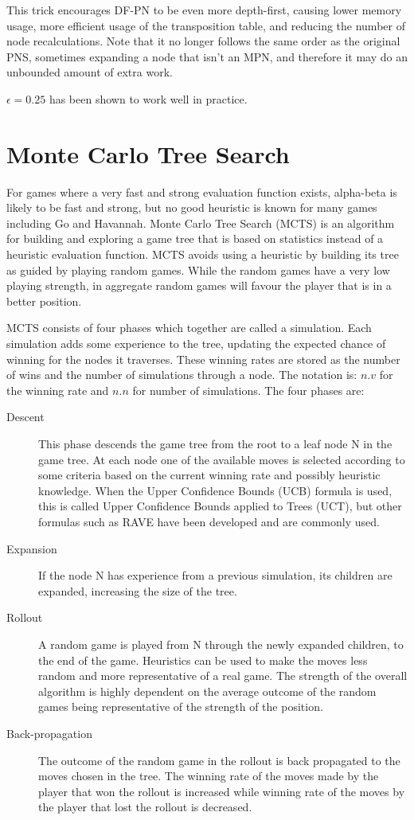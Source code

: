 This trick encourages DF-PN to be even more depth-first, causing lower memory usage, more efficient usage of the transposition table, and reducing the number of node recalculations. Note that it no longer follows the same order as the original PNS, sometimes expanding a node that isn't an MPN, and therefore it may do an unbounded amount of extra work.

$\epsilon = 0.25$ has been shown to work well in practice.


\section{Monte Carlo Tree Search}

For games where a very fast and strong evaluation function exists, alpha-beta is likely to be fast and strong, but no good heuristic is known for many games including Go and Havannah. Monte Carlo Tree Search (MCTS) is an algorithm for building and exploring a game tree that is based on statistics instead of a heuristic evaluation function. MCTS avoids using a heuristic by building its tree as guided by playing random games. While the random games have a very low playing strength, in aggregate random games will favour the player that is in a better position.

MCTS consists of four phases which together are called a simulation. Each simulation adds some experience to the tree, updating the expected chance of winning for the nodes it traverses. These winning rates are stored as the number of wins and the number of simulations through a node. The notation is: $n.v$ for the winning rate and $n.n$ for number of simulations. The four phases are:
\begin{description}
\item[Descent] This phase descends the game tree from the root to a leaf node N in the game tree. At each node one of the available moves is selected according to some criteria based on the current winning rate and possibly heuristic knowledge. When the Upper Confidence Bounds (UCB) formula is used, this is called Upper Confidence Bounds applied to Trees (UCT), but other formulas such as RAVE have been developed and are commonly used.
\item[Expansion] If the node N has experience from a previous simulation, its children are expanded, increasing the size of the tree.
\item[Rollout] A random game is played from N through the newly expanded children, to the end of the game. Heuristics can be used to make the moves less random and more representative of a real game. The strength of the overall algorithm is highly dependent on the average outcome of the random games being representative of the strength of the position.
\item[Back-propagation] The outcome of the random game in the rollout is back propagated to the moves chosen in the tree. The winning rate of the moves made by the player that won the rollout is increased while winning rate of the moves by the player that lost the rollout is decreased.
\end{description}


